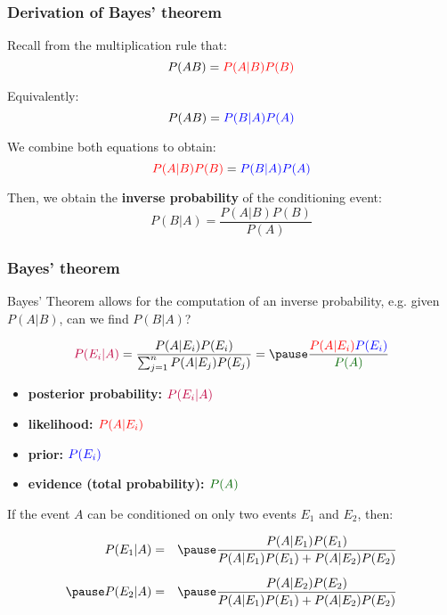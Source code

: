 \documentclass[usenames,dvipsnames,smaller]{beamer}
\newcommand{\?}{\stackrel{?}{=}}
\newcommand{\fr}{\frac}
\newcommand{\rd}{\color{red}}
\newcommand{\bl}{\color{blue}}
\newcommand{\pl}{\color{purple}}
\newcommand{\gr}{\color{green!40!black}}
\begin{document}
\begin{frame}
  \frametitle{Derivation of Bayes' theorem} \pause
  
  Recall from the multiplication rule that:\pause
  \begin{equation}
    \label{eq:21}
    P(AB) =   \rd P(A|B)P(B)
  \end{equation}

  \pause

  \medskip
  
  Equivalently: \pause
  \begin{equation}
    \label{eq:22}
    P(AB) =\bl P(B|A)P(A) 
  \end{equation}
  \pause

  We combine both equations to obtain:
  \pause
  \begin{equation}
    \label{eq:23}
   {\rd P(A|B)P(B)} = {\bl P(B|A)P(A)}
  \end{equation}

  \pause

  \medskip
  
  Then, we obtain the \textbf{inverse probability} of the conditioning event:\pause
  \begin{equation}
    \label{eq:24}
    P(B|A) = \fr{P(A|B)P(B)}{P(A)}
  \end{equation}
  \pause

\end{frame}


\begin{frame}
  \frametitle{Bayes' theorem}\pause

  Bayes' Theorem allows for the computation of an inverse probability, e.g. given $P(A|B)$, can we find $P(B|A)$?
  
  \pause
  \begin{block}{}
  \begin{equation}
    \label{eq:25}
    {\pl P(E_i|A)} =\fr{P(A|E_i)P(E_i)}{\sum_{j=1}^{n}P(A|E_j)P(E_j)} = \pause \fr{{\rd P(A|E_i)}{\bl P(E_{i})}}{\gr P(A)}
  \end{equation}
  \pause
  \begin{itemize}[<+->]
  \item {\bf posterior probability: $\pl P(E_i|A)$}
  \item {\bf likelihood: $\rd P(A|E_{i})$}
  \item {\bf prior: $\bl P(E_{i})$}
  \item {\bf evidence (total probability): $\gr P(A)$}
  \end{itemize}
\end{block}

\pause

If the event $A$ can be conditioned on only two events $E_{1}$ and $E_{2}$, then: \pause

\begin{eqnarray}
  P(E_{1}|A) &=& \pause \fr{P(A|E_{1})P(E_{1})}{P(A|E_{1})P(E_{1}) + P(A|E_{2})P(E_{2}) } \\[2mm] \pause
  P(E_{2}|A) &=& \pause \fr{P(A|E_{2})P(E_{2})}{P(A|E_{1})P(E_{1}) + P(A|E_{2})P(E_{2}) } 
\end{eqnarray}
\end{frame}
\end{document}
